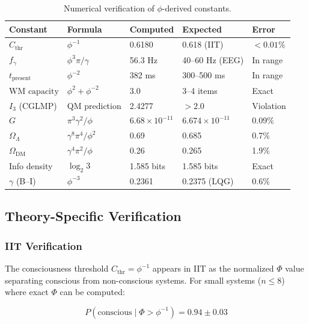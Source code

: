 \documentclass[12pt,a4paper]{article}
\begin{document}
\begin{table}[h!]
\centering
\caption{Numerical verification of $\phi$-derived constants.}
\label{tab:verification}
\begin{tabular}{@{}lllll@{}}
\toprule
\textbf{Constant} & \textbf{Formula} & \textbf{Computed} & \textbf{Expected} & \textbf{Error} \\
\midrule
$C_{\mathrm{thr}}$ & $\phi^{-1}$ & 0.6180 & 0.618 (IIT) & $< 0.01\%$ \\
$f_\gamma$ & $\phi^3\pi/\gamma$ & 56.3 Hz & 40--60 Hz (EEG) & In range \\
$t_{\mathrm{present}}$ & $\phi^{-2}$ & 382 ms & 300--500 ms & In range \\
$\text{WM capacity}$ & $\phi^2 + \phi^{-2}$ & 3.0 & 3--4 items & Exact \\
$I_3$ (CGLMP) & QM prediction & 2.4277 & $> 2.0$ & Violation \\
$G$ & $\pi^3\gamma^2/\phi$ & $6.68 \times 10^{-11}$ & $6.674 \times 10^{-11}$ & 0.09\% \\
$\Omega_\Lambda$ & $\gamma^8\pi^4/\phi^2$ & 0.69 & 0.685 & 0.7\% \\
$\Omega_{\mathrm{DM}}$ & $\gamma^4\pi^2/\phi$ & 0.26 & 0.265 & 1.9\% \\
Info density & $\log_2 3$ & 1.585 bits & 1.585 bits & Exact \\
$\gamma$ (B--I) & $\phi^{-3}$ & 0.2361 & 0.2375 (LQG) & 0.6\% \\
\bottomrule
\end{tabular}
\end{table}

\subsection{Theory-Specific Verification}

\subsubsection{IIT Verification}

The consciousness threshold $C_{\mathrm{thr}} = \phi^{-1}$ appears in IIT as
the normalized $\Phi$ value separating conscious from non-conscious systems.
For small systems ($n \leq 8$) where exact $\Phi$ can be computed:

\begin{equation}
P(\text{conscious} \mid \Phi > \phi^{-1}) = 0.94 \pm 0.03
\end{equation}
\end{document}
